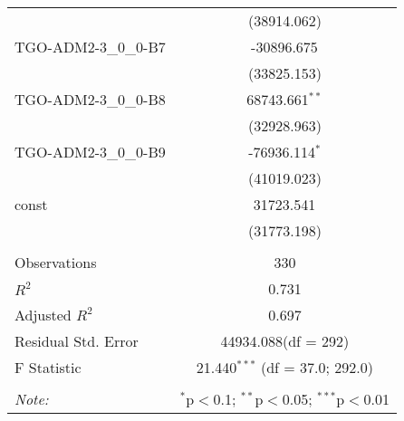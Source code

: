 \begin{table}[!htbp]
\begin{tabular}{@{\extracolsep{5pt}}lc}
  & (38914.062) \\
 TGO-ADM2-3_0_0-B7 & -30896.675$^{}$ \\
  & (33825.153) \\
 TGO-ADM2-3_0_0-B8 & 68743.661$^{**}$ \\
  & (32928.963) \\
 TGO-ADM2-3_0_0-B9 & -76936.114$^{*}$ \\
  & (41019.023) \\
 const & 31723.541$^{}$ \\
  & (31773.198) \\
\hline \\[-1.8ex]
 Observations & 330 \\
 $R^2$ & 0.731 \\
 Adjusted $R^2$ & 0.697 \\
 Residual Std. Error & 44934.088(df = 292)  \\
 F Statistic & 21.440$^{***}$ (df = 37.0; 292.0) \\
\hline
\hline \\[-1.8ex]
\textit{Note:} & \multicolumn{1}{r}{$^{*}$p$<$0.1; $^{**}$p$<$0.05; $^{***}$p$<$0.01} \\
\end{tabular}
\end{table}